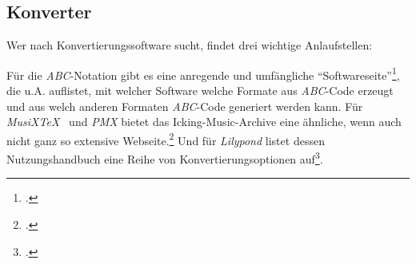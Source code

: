 %
%
%



\subsection{Konverter}

Wer nach Konvertierungssoftware sucht, findet drei wichtige Anlaufstellen:

Für die \textit{ABC}-Notation gibt es eine anregende und umfängliche
\enquote{Softwareseite}\footcite[vgl.][\nopage wp]{Abc2018b}, die u.A.
auflistet, mit welcher Software welche Formate aus \textit{ABC}-Code erzeugt und
aus welch anderen Formaten \textit{ABC}-Code generiert werden kann. Für
\textit{MusiX\TeX\ } und \textit{PMX} bietet das Icking-Music-Archive eine
ähnliche, wenn auch nicht ganz so extensive Webseite.\footcite[vgl.][\nopage
wp]{Tennent2018b} Und für \textit{Lilypond} listet dessen Nutzungshandbuch eine Reihe von
Konvertierungsoptionen auf\footcite[vgl.][42ff]{LilyPond2018e}.

